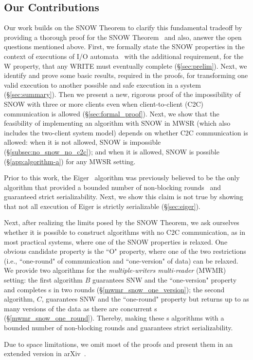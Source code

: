 \subsection{Our Contributions}
{\color{blue}
Our work builds on the SNOW Theorem to clarify this fundamental tradeoff by providing a thorough proof for the SNOW Theorem~\cite{SNOW2016} and also, answer the open questions mentioned above. 
First, we formally state the SNOW properties in the context of executions of I/O automata~\cite{Lynch1996}  with the additional requirement, for the W property, that any WRITE must eventually complete (\S\ref{sec:prelim}). Next, we identify and prove some basic results, required in the proofs, for transforming one valid execution to another possible and safe execution in a \rot{} system (\S\ref{sec:summary}). 
Then we present a new, rigorous proof of the impossibility of SNOW with three or more clients even when client-to-client (C2C) communication is allowed (\S\ref{sec:formal_proof}).
Next, we show that the feasibility of implementing an algorithm with SNOW in MWSR (which also includes the two-client system model) depends on whether C2C communication is allowed:
when it is not allowed, SNOW is impossible (\S\ref{subsec:no_snow_no_c2c}); and when it is allowed, SNOW is possible (\S\ref{app:algorithm-a}) for any MWSR setting.

Prior to this work, the Eiger~\cite{Lloyd:nsdi2013} algorithm was previously believed to be the only algorithm that provided a bounded number of non-blocking rounds~\cite{Lloyd:nsdi2013} and guaranteed strict serializability. 
Next, we show this claim is not true by showing that not all execution of Eiger is strictly serializable (\S\ref{sec:eiger}).

Next, after realizing the limits posed by the SNOW Theorem, we ask ourselves whether it is possible to construct \rot{} algorithms with no C2C communication, as in most practical systems, where one of the SNOW properties is relaxed. One obvious candidate property is the ``O" property, where one of the two restrictions (i.e., ``one-round" of communication and ``one-version" of data) can be relaxed. We provide two algorithms for the \emph{multiple-writers multi-reader} (MWMR) setting: the first algorithm $B$ guarantees SNW and the ``one-version" property and completes \rot{}s in two rounds (\S\ref{mwmr_snow_one_version}); the second algorithm, $C$, guarantees SNW and the ``one-round" property but returns up to as many versions of the data as there are concurrent \wot{}s
(\S\ref{mwmr_snow_one_round}). Thereby, making these \rot{}s algorithms with a bounded number of non-blocking rounds and guarantees strict serializability. 

Due to space limitations, we omit most of the proofs and present them in an extended version in arXiv~\cite{konwar2018snow}.
}

